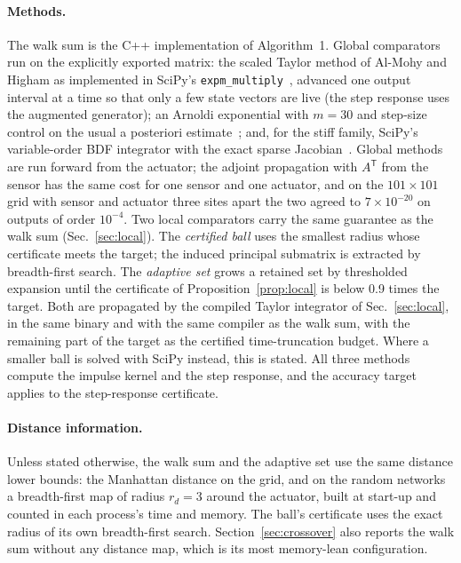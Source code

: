 \documentclass[aps,pra,superscriptaddress,floatfix,longbibliography,twocolumn]{revtex4-2}
\begin{document}
\paragraph*{Methods.} The walk sum is the C++ implementation of Algorithm~1. Global comparators run on the explicitly exported matrix: the scaled Taylor method of Al-Mohy and Higham as implemented in SciPy's \texttt{expm\_multiply}~\cite{almohy2011,virtanen2020}, advanced one output interval at a time so that only a few state vectors are live (the step response uses the augmented generator); an Arnoldi exponential with $m=30$ and step-size control on the usual a posteriori estimate~\cite{hochbruck1997,sidje1998}; and, for the stiff family, SciPy's variable-order BDF integrator with the exact sparse Jacobian~\cite{shampine1997}. Global methods are run forward from the actuator; the adjoint propagation with $A^{\mathsf T}$ from the sensor has the same cost for one sensor and one actuator, and on the $101\times101$ grid with sensor and actuator three sites apart the two agreed to $7\times10^{-20}$ on outputs of order $10^{-4}$. Two local comparators carry the same guarantee as the walk sum (Sec.~\ref{sec:local}). The \emph{certified ball} uses the smallest radius whose certificate meets the target; the induced principal submatrix is extracted by breadth-first search. The \emph{adaptive set} grows a retained set by thresholded expansion until the certificate of Proposition~\ref{prop:local} is below 0.9 times the target. Both are propagated by the compiled Taylor integrator of Sec.~\ref{sec:local}, in the same binary and with the same compiler as the walk sum, with the remaining part of the target as the certified time-truncation budget. Where a smaller ball is solved with SciPy instead, this is stated. All three methods compute the impulse kernel and the step response, and the accuracy target applies to the step-response certificate.

\paragraph*{Distance information.} Unless stated otherwise, the walk sum and the adaptive set use the same distance lower bounds: the Manhattan distance on the grid, and on the random networks a breadth-first map of radius $r_d=3$ around the actuator, built at start-up and counted in each process's time and memory. The ball's certificate uses the exact radius of its own breadth-first search. Section~\ref{sec:crossover} also reports the walk sum without any distance map, which is its most memory-lean configuration.
\end{document}
